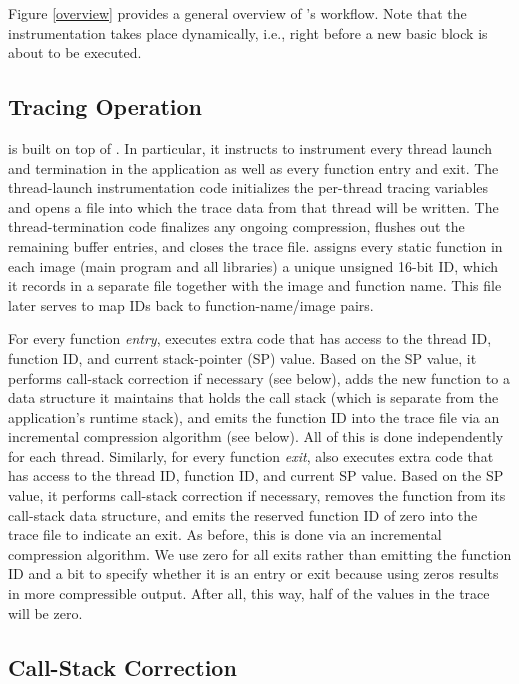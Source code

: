 ﻿Figure \ref{overview} provides a general overview of \parlot 's workflow. Note that the instrumentation takes place dynamically, i.e., right before a new basic block is about to be executed.


\subsection{Tracing Operation}

\parlot is built on top of \pin. In particular, it instructs \pin to instrument every thread launch and termination in the application as well as every function entry and exit. The thread-launch instrumentation code initializes the per-thread tracing variables and opens a file into which the trace data from that thread will be written. The thread-termination code finalizes any ongoing compression, flushes out the remaining buffer entries, and closes the trace file. \parlot assigns every static function in each image (main program and all libraries) a unique unsigned 16-bit ID, which it records in a separate file together with the image and function name. This file later serves to map IDs back to function-name/image pairs.

For every function \emph{entry}, \parlot executes extra code that has access to the thread ID, function ID, and current stack-pointer (SP) value. Based on the SP value, it performs call-stack correction if necessary (see below), adds the new function to a data structure it maintains that holds the call stack (which is separate from the application's runtime stack), and emits the function ID into the trace file via an incremental compression algorithm (see below). All of this is done independently for each thread. Similarly, for every function \emph{exit}, \parlot also executes extra code that has access to the thread ID, function ID, and current SP value. Based on the SP value, it performs call-stack correction if necessary, removes the function from its call-stack data structure, and emits the reserved function ID of zero into the trace file to indicate an exit. As before, this is done via an incremental compression algorithm. We use zero for all exits rather than emitting the function ID and a bit to specify whether it is an entry or exit because using zeros results in more compressible output. After all, this way, half of the values in the trace will be zero.


\subsection{Call-Stack Correction}


